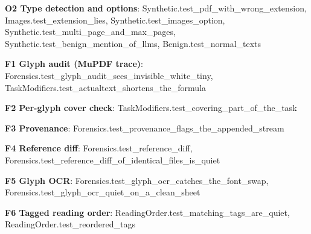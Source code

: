 \documentclass[10pt,a4paper]{article}
\begin{document}
\textbf{O2 Type detection and options}: \textcolor{ok}{Synthetic.\allowbreak{}test\_\allowbreak{}pdf\_\allowbreak{}with\_\allowbreak{}wrong\_\allowbreak{}extension}, \textcolor{ok}{Images.\allowbreak{}test\_\allowbreak{}extension\_\allowbreak{}lies}, \textcolor{ok}{Synthetic.\allowbreak{}test\_\allowbreak{}images\_\allowbreak{}option}, \textcolor{ok}{Synthetic.\allowbreak{}test\_\allowbreak{}multi\_\allowbreak{}page\_\allowbreak{}and\_\allowbreak{}max\_\allowbreak{}pages}, \textcolor{ok}{Synthetic.\allowbreak{}test\_\allowbreak{}benign\_\allowbreak{}mention\_\allowbreak{}of\_\allowbreak{}llms}, \textcolor{ok}{Benign.\allowbreak{}test\_\allowbreak{}normal\_\allowbreak{}texts}\par
\textbf{F1 Glyph audit (MuPDF trace)}: \textcolor{ok}{Forensics.\allowbreak{}test\_\allowbreak{}glyph\_\allowbreak{}audit\_\allowbreak{}sees\_\allowbreak{}invisible\_\allowbreak{}white\_\allowbreak{}tiny}, \textcolor{ok}{TaskModifiers.\allowbreak{}test\_\allowbreak{}actualtext\_\allowbreak{}shortens\_\allowbreak{}the\_\allowbreak{}formula}\par
\textbf{F2 Per-glyph cover check}: \textcolor{ok}{TaskModifiers.\allowbreak{}test\_\allowbreak{}covering\_\allowbreak{}part\_\allowbreak{}of\_\allowbreak{}the\_\allowbreak{}task}\par
\textbf{F3 Provenance}: \textcolor{ok}{Forensics.\allowbreak{}test\_\allowbreak{}provenance\_\allowbreak{}flags\_\allowbreak{}the\_\allowbreak{}appended\_\allowbreak{}stream}\par
\textbf{F4 Reference diff}: \textcolor{ok}{Forensics.\allowbreak{}test\_\allowbreak{}reference\_\allowbreak{}diff}, \textcolor{ok}{Forensics.\allowbreak{}test\_\allowbreak{}reference\_\allowbreak{}diff\_\allowbreak{}of\_\allowbreak{}identical\_\allowbreak{}files\_\allowbreak{}is\_\allowbreak{}quiet}\par
\textbf{F5 Glyph OCR}: \textcolor{ok}{Forensics.\allowbreak{}test\_\allowbreak{}glyph\_\allowbreak{}ocr\_\allowbreak{}catches\_\allowbreak{}the\_\allowbreak{}font\_\allowbreak{}swap}, \textcolor{bad}{Forensics.\allowbreak{}test\_\allowbreak{}glyph\_\allowbreak{}ocr\_\allowbreak{}quiet\_\allowbreak{}on\_\allowbreak{}a\_\allowbreak{}clean\_\allowbreak{}sheet}\par
\textbf{F6 Tagged reading order}: \textcolor{ok}{ReadingOrder.\allowbreak{}test\_\allowbreak{}matching\_\allowbreak{}tags\_\allowbreak{}are\_\allowbreak{}quiet}, \textcolor{ok}{ReadingOrder.\allowbreak{}test\_\allowbreak{}reordered\_\allowbreak{}tags}\par
\end{document}
